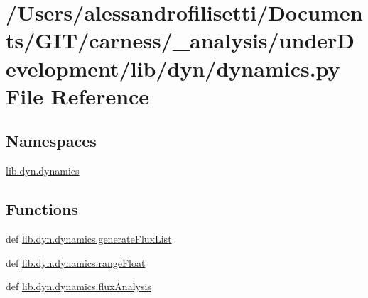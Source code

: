 \hypertarget{a00053}{\section{/\-Users/alessandrofilisetti/\-Documents/\-G\-I\-T/carness/\-\_\-analysis/under\-Development/lib/dyn/dynamics.py File Reference}
\label{a00053}
}
\subsection*{Namespaces}
\begin{DoxyCompactItemize}
\item 
\hyperlink{a00110}{lib.\-dyn.\-dynamics}
\end{DoxyCompactItemize}
\subsection*{Functions}
\begin{DoxyCompactItemize}
\item 
def \hyperlink{a00110_a5c7482c3127ef70514cbc82ce1aa9f47}{lib.\-dyn.\-dynamics.\-generate\-Flux\-List}
\item 
def \hyperlink{a00110_acbc0de876640b8d5355bf6a0e4fdef4a}{lib.\-dyn.\-dynamics.\-range\-Float}
\item 
def \hyperlink{a00110_ac3232f52dce6e169a93eba81f8fb926e}{lib.\-dyn.\-dynamics.\-flux\-Analysis}
\end{DoxyCompactItemize}
